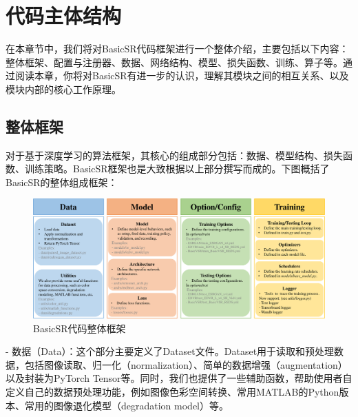 \documentclass[../main.tex]{subfiles}
\begin{document}
	
	\chapter{代码主体结构}
	\vspace{-2cm}
	
	在本章节中，我们将对BasicSR代码框架进行一个整体介绍，主要包括以下内容：整体框架、配置与注册器、数据、网络结构、模型、损失函数、训练、算子等。通过阅读本章，你将对BasicSR有进一步的认识，理解其模块之间的相互关系、以及模块内部的核心工作原理。
	
	
	\section{整体框架}
	对于基于深度学习的算法框架，其核心的组成部分包括：数据、模型结构、损失函数、训练策略。BasicSR框架也是大致根据以上部分撰写而成的。下图概括了BasicSR的整体组成框架：
	
	\begin{figure}[htbp]
		\begin{center}
			\includegraphics[width=1\linewidth]{figures/main_framework.pdf}
		\end{center}
		\caption{BasicSR代码整体框架}
		\label{fig:main_framework}
		
	\end{figure}
	
	- 数据（Data）：这个部分主要定义了Dataset文件。Dataset用于读取和预处理数据，包括图像读取、归一化（normalization）、简单的数据增强（augmentation）以及封装为PyTorch Tensor等。同时，我们也提供了一些辅助函数，帮助使用者自定义自己的数据预处理功能，例如图像色彩空间转换、常用MATLAB的Python版本、常用的图像退化模型（degradation model）等。
	
\end{document}
